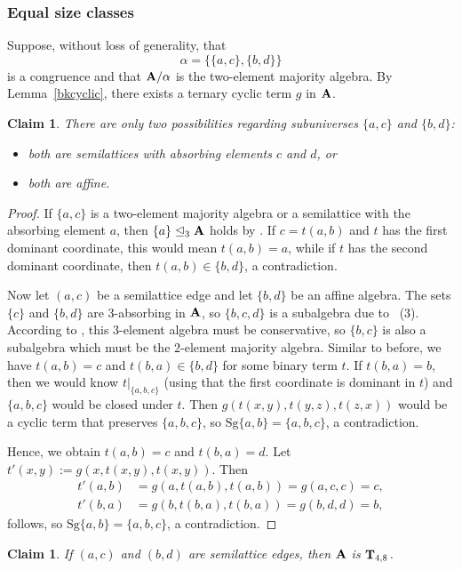 \documentclass[11pt]{amsart}
\newcommand{\m}[1]{\mathbf{\uppercase{#1}}}
\theoremstyle{definition}
\theoremstyle{remark}
\theoremstyle{plain}
\newtheorem{claim}[thm]{Claim}
\begin{document}
\subsubsection{Equal size classes}
Suppose, without loss of generality, that $$\alpha=\{\{a,c\},\{b,d\}\}$$ is a congruence and that $\m a/\alpha$ is the two-element majority algebra. By Lemma~\ref{bkcyclic}, there exists a ternary cyclic term $g$ in $\m a$.
\begin{claim}
    There are only two possibilities regarding subuniverses $\{a,c\}$ and $\{b,d\}$:
    \begin{itemize}
        \item both are semilattices with absorbing elements $c$ and $d$, or
        \item both are affine.
    \end{itemize}
\end{claim}
\begin{proof}
If $\{a,c\}$ is a two-element majority algebra or a semilattice with the absorbing element $a$, then $\{a\}\trianglelefteq_3 {\m A}$ holds by . If $c=t(a,b)$ and $t$ has the first dominant coordinate, this would mean $t(a,b)=a$, while if $t$ has the second dominant coordinate, then $t(a,b)\in\{b,d\}$, a contradiction.

Now let $(a,c)$ be a semilattice edge and let $\{b,d\}$ be an affine algebra. The sets $\{c\}$ and $\{b,d\}$ are 3-absorbing in $\m a$, so $\{b,c,d\}$ is a subalgebra due to ~(3). According to , this 3-element algebra must be conservative, so $\{b,c\}$ is also a subalgebra which must be the 2-element majority algebra. Similar to before, we have $t(a,b)=c$ and $t(b,a)\in \{b,d\}$ for some binary term $t$. If $t(b,a)=b$, then we would know $t|_{\{a,b,c\}}$ (using that the first coordinate is dominant in $t$) and $\{a,b,c\}$ would be closed under $t$. Then $g(t(x,y),t(y,z),t(z,x))$ would be a cyclic term that preserves $\{a,b,c\}$, so $\mathrm{Sg}\{a,b\}=\{a,b,c\}$, a contradiction. 

Hence, we obtain $t(a,b)=c$ and $t(b,a)=d$. Let $t'(x,y):=g(x,t(x,y),t(x,y))$. Then
 \begin{align*}
     t'(a,b)&=g(a,t(a,b),t(a,b))=g(a,c,c)=c,\\
     t'(b,a)&=g(b,t(b,a),t(b,a))=g(b,d,d)=b,
 \end{align*}
 follows, so $\mathrm{Sg}\{a,b\}=\{a,b,c\}$, a contradiction.  
\end{proof}


\begin{claim}
If $(a,c)$ and $(b,d)$ are semilattice edges, then $\m a$ is $\m t_{4,8}$.
\end{claim}
\end{document}
